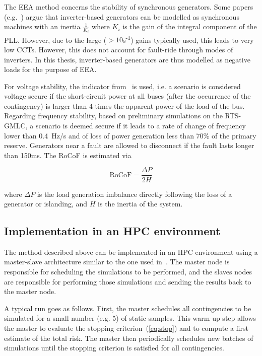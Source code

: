 The EEA method concerns the stability of synchronous generators. Some papers (e.g.~\cite{ScreeningPLL}) argue that inverter-based generators can be modelled as synchronous machines with an inertia \(\frac{1}{K_i}\) where \(K_i\) is the gain of the integral component of the PLL. However, due to the large (\(>10\)s\textsuperscript{-1}) gains typically used, this leads to very low CCTs. However, this does not account for fault-ride through modes of inverters. In this thesis, inverter-based generators are thus modelled as negative loads for the purpose of EEA.

For voltage stability, the indicator from~\cite{VoltageScreeningMachowski} is used, i.e. a scenario is considered voltage secure if the short-circuit power at all buses (after the occurrence of the contingency) is larger than 4 times the apparent power of the load of the bus. Regarding frequency stability, based on preliminary simulations on the RTS-GMLC, a scenario is deemed secure if it leads to a rate of change of frequency lower than 0.4~Hz/s and of loss of power generation less than 70\% of the primary reserve. Generators near a fault are allowed to disconnect if the fault lasts longer than 150ms. The RoCoF is estimated via

\begin{equation}
\text{RoCoF} = \frac{\Delta P}{2 H}
\end{equation}

\noindent where \(\Delta P\) is the load generation imbalance directly following the loss of a generator or islanding, and \(H\) is the inertia of the system.


\subsection{Implementation in an HPC environment}
\label{sec:HPC}

The method described above can be implemented in an HPC environment using a master-slave architecture similar to the one used in~\cite{EurostagHPC}. The master node is responsible for scheduling the simulations to be performed, and the slaves nodes are responsible for performing those simulations and sending the results back to the master node.

A typical run goes as follows. First, the master schedules all contingencies to be simulated for a small number (e.g. 5) of static samples. This warm-up step allows the master to evaluate the stopping criterion~(\ref{eq:stop}) and to compute a first estimate of the total risk. The master then periodically schedules new batches of simulations until the stopping criterion is satisfied for all contingencies.

